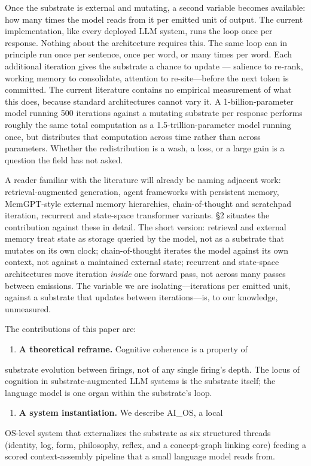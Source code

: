 \documentclass[11pt,letterpaper]{article}
\begin{document}
Once the substrate is external and mutating, a second variable
becomes available: how many times the model reads from it per
emitted unit of output. The current implementation, like every
deployed LLM system, runs the loop once per response. Nothing about
the architecture requires this. The same loop can in principle run
once per sentence, once per word, or many times per word. Each
additional iteration gives the substrate a chance to update —
salience to re-rank, working memory to consolidate, attention to
re-site---before the next token is committed. The current
literature contains no empirical measurement of what this does,
because standard architectures cannot vary it. A 1-billion-parameter
model running 500 iterations against a mutating substrate per
response performs roughly the same total computation as a
1.5-trillion-parameter model running once, but distributes that
computation across time rather than across parameters. Whether the
redistribution is a wash, a loss, or a large gain is a question
the field has not asked.

A reader familiar with the literature will already be naming
adjacent work: retrieval-augmented generation, agent frameworks
with persistent memory, MemGPT-style external memory hierarchies,
chain-of-thought and scratchpad iteration, recurrent and
state-space transformer variants. §2 situates the contribution
against these in detail. The short version: retrieval and external
memory treat state as storage queried by the model, not as a
substrate that mutates on its own clock; chain-of-thought iterates
the model against its own context, not against a maintained
external state; recurrent and state-space architectures move
iteration \emph{inside} one forward pass, not across many passes between
emissions. The variable we are isolating---iterations per emitted
unit, against a substrate that updates between iterations---is, to
our knowledge, unmeasured.

The contributions of this paper are:

\begin{enumerate}
  \item \textbf{A theoretical reframe.} Cognitive coherence is a property of
\end{enumerate}
   substrate evolution between firings, not of any single firing's
   depth. The locus of cognition in substrate-augmented LLM systems
   is the substrate itself; the language model is one organ within
   the substrate's loop.

\begin{enumerate}
  \item \textbf{A system instantiation.} We describe AI\_OS, a local
\end{enumerate}
   OS-level system that externalizes the substrate as six structured
   threads (identity, log, form, philosophy, reflex, and a
   concept-graph linking core) feeding a scored context-assembly
   pipeline that a small language model reads from.
\end{document}
